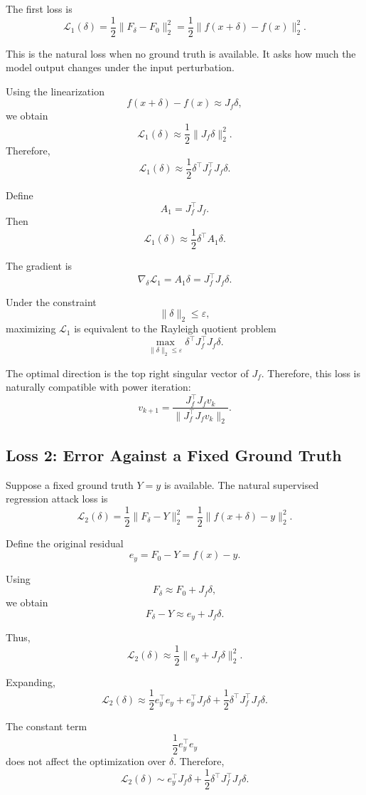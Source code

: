 \documentclass{article}
\begin{document}
The first loss is
\[
    \mathcal{L}_1(\delta)
    =
    \frac{1}{2}\|F_\delta-F_0\|_2^2
    =
    \frac{1}{2}\|f(x+\delta)-f(x)\|_2^2.
\]

This is the natural loss when no ground truth is available. It asks how much the model output changes under the input perturbation.

Using the linearization
\[
    f(x+\delta)-f(x)
    \approx
    J_f\delta,
\]
we obtain
\[
    \mathcal{L}_1(\delta)
    \approx
    \frac{1}{2}\|J_f\delta\|_2^2.
\]
Therefore,
\[
    \mathcal{L}_1(\delta)
    \approx
    \frac{1}{2}\delta^\top J_f^\top J_f\delta.
\]

Define
\[
    A_1 = J_f^\top J_f.
\]
Then
\[
    \mathcal{L}_1(\delta)
    \approx
    \frac{1}{2}\delta^\top A_1\delta.
\]

The gradient is
\[
    \nabla_\delta \mathcal{L}_1
    =
    A_1\delta
    =
    J_f^\top J_f\delta.
\]

Under the constraint
\[
    \|\delta\|_2\le \varepsilon,
\]
maximizing \(\mathcal{L}_1\) is equivalent to the Rayleigh quotient problem
\[
    \max_{\|\delta\|_2\le \varepsilon}
    \delta^\top J_f^\top J_f\delta.
\]

The optimal direction is the top right singular vector of \(J_f\). Therefore, this loss is naturally compatible with power iteration:
\[
    v_{k+1}
    =
    \frac{J_f^\top J_f v_k}
    {\|J_f^\top J_f v_k\|_2}.
\]

\subsection{Loss 2: Error Against a Fixed Ground Truth}

Suppose a fixed ground truth \(Y=y\) is available. The natural supervised regression attack loss is
\[
    \mathcal{L}_2(\delta)
    =
    \frac{1}{2}\|F_\delta-Y\|_2^2
    =
    \frac{1}{2}\|f(x+\delta)-y\|_2^2.
\]

Define the original residual
\[
    e_y = F_0-Y = f(x)-y.
\]

Using
\[
    F_\delta
    \approx
    F_0+J_f\delta,
\]
we obtain
\[
    F_\delta-Y
    \approx
    e_y+J_f\delta.
\]

Thus,
\[
    \mathcal{L}_2(\delta)
    \approx
    \frac{1}{2}\|e_y+J_f\delta\|_2^2.
\]

Expanding,
\[
    \mathcal{L}_2(\delta)
    \approx
    \frac{1}{2}e_y^\top e_y
    +
    e_y^\top J_f\delta
    +
    \frac{1}{2}\delta^\top J_f^\top J_f\delta.
\]

The constant term
\[
    \frac{1}{2}e_y^\top e_y
\]
does not affect the optimization over \(\delta\). Therefore,
\[
    \mathcal{L}_2(\delta)
    \sim
    e_y^\top J_f\delta
    +
    \frac{1}{2}\delta^\top J_f^\top J_f\delta.
\]
\end{document}
